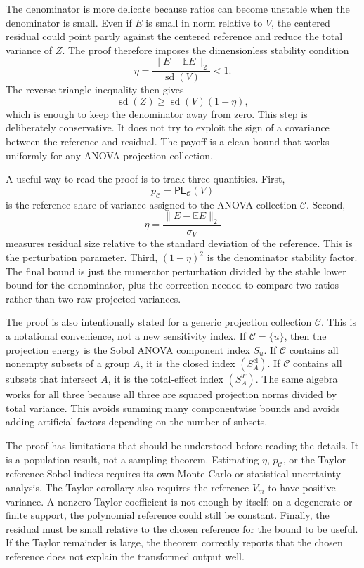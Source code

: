 \documentclass[11pt,letterpaper]{article}
\newcommand{\E}{\mathbb{E}}
\theoremstyle{remark}
\begin{document}
The denominator is more delicate because ratios can become unstable when the
denominator is small. Even if $E$ is small in norm relative to $V$, the centered
residual could point partly against the centered reference and reduce the total
variance of $Z$. The proof therefore imposes the dimensionless stability
condition
\begin{equation}
  \eta=\frac{\|E-\E E\|_2}{\operatorname{sd}(V)}<1.
\end{equation}
The reverse triangle inequality then gives
\begin{equation}
  \operatorname{sd}(Z)\geq \operatorname{sd}(V)(1-\eta),
\end{equation}
which is enough to keep the denominator away from zero. This step is deliberately
conservative. It does not try to exploit the sign of a covariance between the
reference and residual. The payoff is a clean bound that works uniformly for any
ANOVA projection collection.

A useful way to read the proof is to track three quantities. First,
\begin{equation}
  p_{\mathscr C}=\mathsf{PE}_{\mathscr C}(V)
\end{equation}
is the reference share of variance assigned to the ANOVA collection
$\mathscr C$. Second,
\begin{equation}
  \eta=\frac{\|E-\E E\|_2}{\sigma_V}
\end{equation}
measures residual size relative to the standard deviation of the reference. This
is the perturbation parameter. Third, $(1-\eta)^2$ is the denominator stability
factor. The final bound is just the numerator perturbation divided by the stable
lower bound for the denominator, plus the correction needed to compare two
ratios rather than two raw projected variances.

The proof is also intentionally stated for a generic projection collection
$\mathscr C$. This is a notational convenience, not a new sensitivity index. If
$\mathscr C=\{u\}$, then the projection energy is the Sobol ANOVA component
index $S_u$. If $\mathscr C$ contains all nonempty subsets of a group $A$, it is
the closed index $(S_A^{\mathrm{cl}})$. If $\mathscr C$ contains all subsets
that intersect $A$, it is the total-effect index $(S_A^T)$. The same algebra
works for all three because all three are squared projection norms divided by
total variance. This avoids summing many componentwise bounds and avoids adding
artificial factors depending on the number of subsets.

The proof has limitations that should be understood before reading the details.
It is a population result, not a sampling theorem. Estimating
$\eta$, $p_{\mathscr C}$, or the Taylor-reference Sobol indices requires its own
Monte Carlo or statistical uncertainty analysis. The Taylor corollary also
requires the reference $V_m$ to have positive variance. A nonzero Taylor
coefficient is not enough by itself: on a degenerate or finite support, the
polynomial reference could still be constant. Finally, the residual must be
small relative to the chosen reference for the bound to be useful. If the Taylor
remainder is large, the theorem correctly reports that the chosen reference does
not explain the transformed output well.
\end{document}
